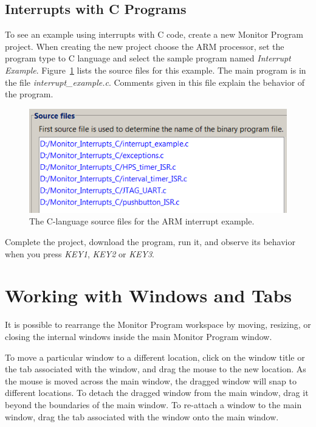 \documentclass[11pt, twoside, pdftex]{article}
\begin{document}
\subsection{Interrupts with C Programs}
\label{sec:7.2}

To see an example using interrupts with C code, 
create a new Monitor Program project.
When creating the new project choose the ARM processor,
set the program type to C language and select the sample
program named {\it Interrupt Example}. 
Figure~\ref{fig:32} lists the source files for this example.
The main program is in the file {\it interrupt\_example.c}.
Comments given in this file explain the behavior of the program.
~\\

\begin{figure}[H]
   \begin{center}
      \includegraphics[scale=1]{screenshots/figure32.png}
   \end{center}
   \caption{The C-language source files for the ARM interrupt example.} 
	 \label{fig:32}
\end{figure}

Complete the project, download the program, run it, and observe
its behavior when you press {\it KEY1}, {\it KEY2} or {\it KEY3}.   


\section{Working with Windows and Tabs}
\label{sec:8}

It is possible to rearrange the Monitor Program workspace by
moving, resizing, or closing the internal windows inside the main
Monitor Program window.

To move a particular window to a different location, click on the
window title or the tab associated with the window, and drag the
mouse to the new location. As the mouse is moved across the main
window, the dragged window will snap to different locations. 
To detach the dragged window from the main window, drag it beyond
the boundaries of the main window. 
To re-attach a window to the main window, drag the tab associated
with the window onto the main window.
\end{document}
